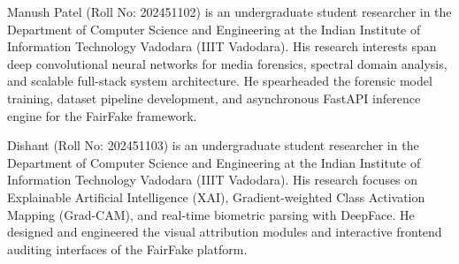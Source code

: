 \documentclass[journal]{IEEEtran}
\begin{document}
\begin{IEEEbiographynophoto}{Manush Patel}
(Roll No: 202451102) is an undergraduate student researcher in the Department of Computer Science and Engineering at the Indian Institute of Information Technology Vadodara (IIIT Vadodara). His research interests span deep convolutional neural networks for media forensics, spectral domain analysis, and scalable full-stack system architecture. He spearheaded the forensic model training, dataset pipeline development, and asynchronous FastAPI inference engine for the FairFake framework.
\end{IEEEbiographynophoto}

\begin{IEEEbiographynophoto}{Dishant}
(Roll No: 202451103) is an undergraduate student researcher in the Department of Computer Science and Engineering at the Indian Institute of Information Technology Vadodara (IIIT Vadodara). His research focuses on Explainable Artificial Intelligence (XAI), Gradient-weighted Class Activation Mapping (Grad-CAM), and real-time biometric parsing with DeepFace. He designed and engineered the visual attribution modules and interactive frontend auditing interfaces of the FairFake platform.
\end{IEEEbiographynophoto}
\end{document}
